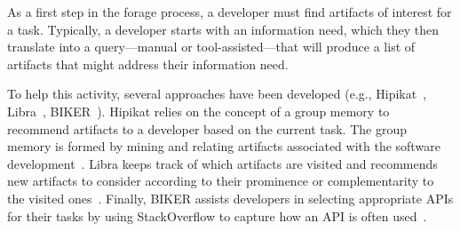 As a first step in the forage process, a developer must
find artifacts of interest for a task. 
Typically, a developer starts with an information need,
which they then translate into a query---manual or tool-assisted---that will 
produce a list of artifacts that might address their information need. 


To help this activity,
several approaches have been developed (e.g.,
Hipikat~\cite{Cubranic2005}, Libra~\cite{Ponzanelli2017},
BIKER~\cite{Jiang2017}).  
Hipikat relies on the concept of a
group memory to recommend artifacts to a developer based on the current task.
The group memory is formed by mining and relating artifacts
associated with the software development~\cite{Cubranic2005}.
Libra 
keeps track of which artifacts are visited and recommends
new artifacts to consider according to their prominence or complementarity to the
visited ones~\cite{Ponzanelli2017}.  Finally, BIKER assists developers
in selecting appropriate APIs for their tasks by using StackOverflow
to capture how an API is often used~\cite{Jiang2017}.





